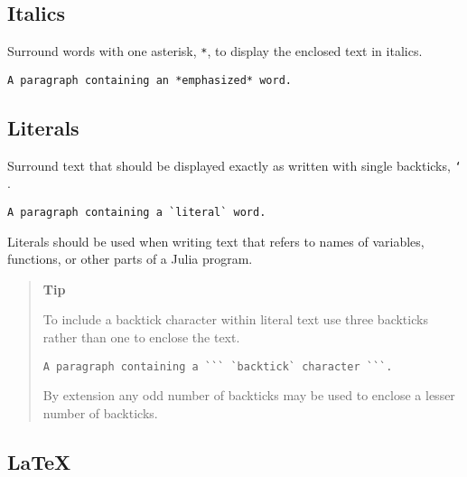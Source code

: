 \hypertarget{4277603997710742460}{}


\subsection{Italics}



Surround words with one asterisk, \texttt{*}, to display the enclosed text in italics.




\begin{lstlisting}
A paragraph containing an *emphasized* word.
\end{lstlisting}



\hypertarget{6850088772867679045}{}


\subsection{Literals}



Surround text that should be displayed exactly as written with single backticks, \texttt{`} .




\begin{lstlisting}
A paragraph containing a `literal` word.
\end{lstlisting}



Literals should be used when writing text that refers to names of variables, functions, or other parts of a Julia program.



\begin{quote}
\textbf{Tip}

To include a backtick character within literal text use three backticks rather than one to enclose the text.


\begin{lstlisting}
A paragraph containing a ``` `backtick` character ```.
\end{lstlisting}

By extension any odd number of backticks may be used to enclose a lesser number of backticks.

\end{quote}


\hypertarget{6917271240677862304}{}


\subsection{\LaTeX}



